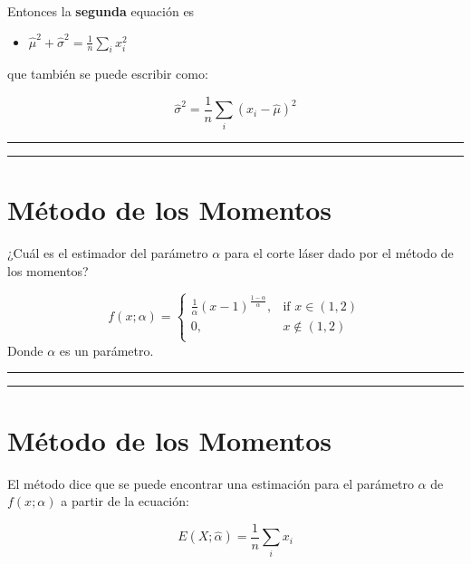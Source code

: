 \documentclass[
]{book}
\providecommand{\tightlist}{%
  \setlength{\itemsep}{0pt}\setlength{\parskip}{0pt}}
\begin{document}
Entonces la \textbf{segunda} equación es

\begin{itemize}
\tightlist
\item
  \(\hat{\mu}^2+\hat{\sigma}^2= \frac{1}{n} \sum_i x^2_i\)
\end{itemize}

que también se puede escribir como:

\[\hat{\sigma}^2=\frac{1}{n} \sum_i(x_i-\hat{\mu})^2\]

\begin{center}\rule{0.5\linewidth}{0.5pt}\end{center}

\begin{center}\rule{0.5\linewidth}{0.5pt}\end{center}

\hypertarget{muxe9todo-de-los-momentos-7}{%
\section{Método de los Momentos}\label{muxe9todo-de-los-momentos-7}}

¿Cuál es el estimador del parámetro \(\alpha\) para el corte láser dado por el método de los momentos?

\[
    f(x; \alpha)= 
\begin{cases}
\frac{1}{\alpha}(x-1)^{\frac{1-\alpha}{\alpha}},& \text{if } x \in (1,2)\\
    0,& x \notin (1,2)\\
\end{cases}
\]
Donde \(\alpha\) es un parámetro.

\begin{center}\rule{0.5\linewidth}{0.5pt}\end{center}

\begin{center}\rule{0.5\linewidth}{0.5pt}\end{center}

\hypertarget{muxe9todo-de-los-momentos-8}{%
\section{Método de los Momentos}\label{muxe9todo-de-los-momentos-8}}

El método dice que se puede encontrar una estimación para el parámetro \(\alpha\) de \(f(x;\alpha)\) a partir de la ecuación:

\[E(X; \hat{\alpha})=\frac{1}{n}\sum_i x_i\]
\end{document}
